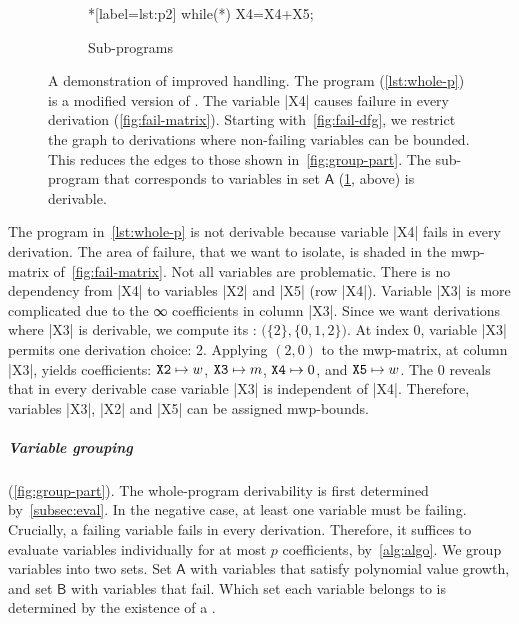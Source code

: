 \begin{figure}
\begin{subfigure}{\textwidth}
{\begin{minipage}{.35\textwidth}
\begin{implisting}
\end{implisting}
\end{minipage}%
\hspace{2em}%
\begin{minipage}{.35\textwidth}
\begin{implisting}*[label={lst:p2}]
while(*) {
  X4=X4+X5;
}
\end{implisting}
\end{minipage}
\caption{Sub-programs}\label{lst:sub-progs}
}\end{subfigure}
\caption[A demonstration of improved derivation failure handling]{
A demonstration of improved  handling. The program
(\ref{lst:whole-p}) is a modified version of \exname. The variable \pr|X4|
causes failure in every derivation (\ref{fig:fail-matrix}). Starting
with~\ref{fig:fail-dfg}, we restrict the graph to derivations where non-failing
variables can be bounded. This reduces the edges to those shown
in~\ref{fig:group-part}. The sub-program that corresponds to variables in set
\(\mathsf{A}\) (\ref{lst:sub-progs}, above) is derivable.
}\label{fig:part-prog}
\end{figure}

\begin{example}\label{ex:whl}
The program in~\autoref{lst:whole-p} is not derivable because variable \pr|X4| fails in every derivation.
The area of failure, that we want to isolate, is shaded in the mwp-matrix of~\autoref{fig:fail-matrix}.
Not all variables are problematic.
There is no dependency from \pr|X4| to variables \pr|X2| and \pr|X5| (row \pr|X4|).
Variable \pr|X3| is more complicated due to the ∞ coefficients in column \pr|X3|.
Since we want derivations where \pr|X3| is derivable, we compute its : \(\big(\{2\}, \{0,1,2\}\big)\).
At index 0, variable \pr|X3| permits one derivation choice: 2.
Applying \((2,0)\) to the mwp-matrix, at column \pr|X3|, yields coefficients:
\(\text{\pr|X2|} \mapsto w\),
\(\text{\pr|X3|} \mapsto m\),
\(\text{\pr|X4|} \mapsto 0\), and
\(\text{\pr|X5|} \mapsto w\).
The \(0\) reveals that in every derivable case variable \pr|X3| is independent of \pr|X4|.
Therefore, variables \pr|X3|, \pr|X2| and \pr|X5| can be assigned mwp-bounds.
\end{example}

\subparagraph*{Variable grouping} (\autoref{fig:group-part}).
The whole-program derivability is first determined by~\autoref{subsec:eval}.
In the negative case, at least one variable must be failing.
Crucially, a failing variable fails in {every derivation}.
Therefore, it suffices to evaluate variables individually for at most \(p\) coefficients, by~\autoref{alg:algo}.
We group variables into two sets.
Set \(\mathsf{A}\) with variables that satisfy polynomial value growth, and set \(\mathsf{B}\) with variables that fail.
Which set each variable belongs to is determined by the existence of a .

